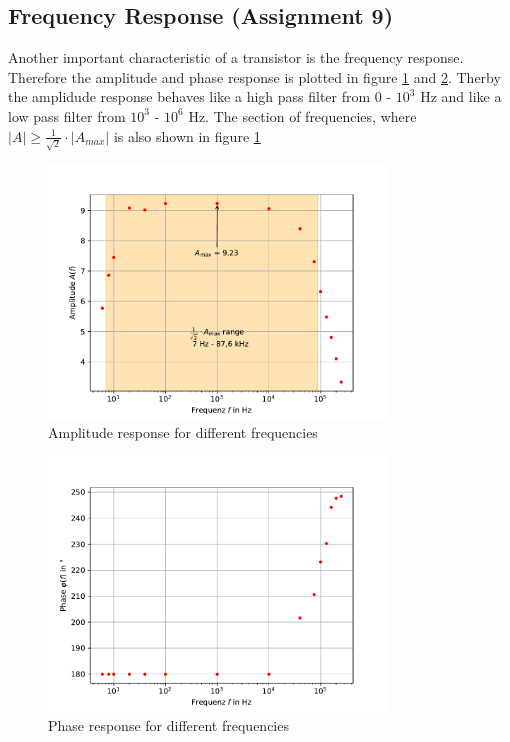 \documentclass[11pt, a4paper]{article}
\begin{document}
\FloatBarrier
\subsection{Frequency Response (Assignment 9)}
Another important characteristic of a transistor is the frequency response. Therefore the amplitude and phase response is plotted in figure \ref{fig:Ampresp} and \ref{fig:Pharesp}.
Therby the amplidude response behaves like a high pass filter from 0 - $10^3$ \si{\hertz} and like a low pass filter from $10^3$ - $10^6$ \si{\hertz}.
The section of frequencies, where $\left\lvert A \right\rvert \geq \frac{1}{\sqrt{2}}  \cdot \left\lvert A_{max} \right\lvert$ is also shown in figure \ref{fig:Ampresp}


\begin{figure}[h]
    \centering
    \includegraphics[width=0.8\textwidth]{plots/Amplitudengang.pdf}
    \caption{Amplitude response for different frequencies}
    \label{fig:Ampresp}
\end{figure}

\begin{figure}[h]
    \centering
    \includegraphics[width=0.8\textwidth]{plots/Phasengang.pdf}
    \caption{Phase response for different frequencies}
    \label{fig:Pharesp}
\end{figure}
\end{document}
